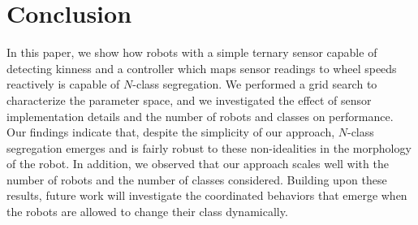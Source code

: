 \documentclass[letterpaper, 10 pt, conference]{ieeeconf}
\begin{document}
\section{Conclusion}

In this paper, we show how robots with a simple ternary sensor capable of
detecting kinness and a controller which maps sensor readings to wheel speeds
reactively is capable of $N$-class segregation. We performed a grid search to
characterize the parameter space, and we investigated the effect of sensor
implementation details and the number of robots and classes on performance. Our
findings indicate that, despite the simplicity of our approach, $N$-class
segregation emerges and is fairly robust to these non-idealities in the
morphology of the robot. In addition, we observed that our approach scales well
with the number of robots and the number of classes considered. Building upon
these results, future work will investigate the coordinated behaviors that
emerge when the robots are allowed to change their class dynamically.



\end{document}

